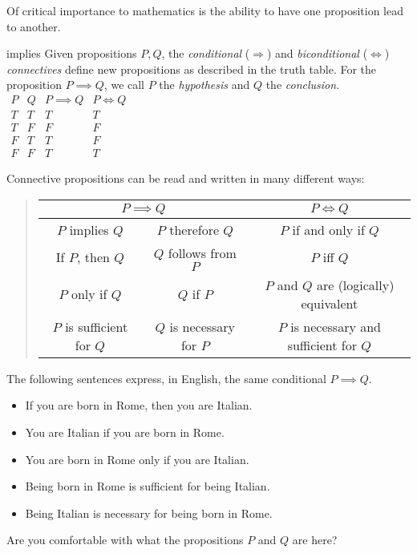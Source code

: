 Of critical importance to mathematics is the ability to have one proposition lead to another.

\begin{defn}[lower separated=false, sidebyside, sidebyside align=top seam, sidebyside gap=0pt, righthand width=0.37\linewidth]{}{implies}
	Given propositions $P,Q$, the \emph{conditional} ($\Longrightarrow$) and \emph{biconditional} ($\Longleftrightarrow$) \emph{connectives} define new propositions as described in the truth table.\smallbreak
	For the proposition $P\implies Q$, we call $P$ the \emph{hypothesis} and $Q$ the \emph{conclusion.}
	\tcblower
	\flushright$\begin{array}{cc||c|c}
	P & Q & P\implies Q & P\iff Q\\\hline
	T & T & T & T\\
	T & F & F & F\\
	F & T & T & F\\
	F & F & T & T
	\end{array}$
\end{defn}

Connective propositions can be read and written in many different ways:
\begin{quote}
	\def\arraystretch{1.05}
	\begin{tabular}{@{}cc|c}
		\multicolumn{2}{c|}{$P\implies Q$} & $P\iff Q$\\\hline
		$P$ implies $Q$ & $P$ therefore $Q$ & $P$ if and only if $Q$\\
		If $P$, then $Q$ & $Q$ follows from $P$ & $P$ iff $Q$\\
		$P$ only if $Q$ & $Q$ if $P$ & $P$ and $Q$ are (logically) equivalent\\
		$P$ is sufficient for $Q$ & $Q$ is necessary for $P$ & $P$ is necessary and sufficient for $Q$
	\end{tabular}
\end{quote}

\begin{example}{}{}
	The following sentences express, in English, the same conditional $P\implies Q$.\vspace{-1pt}
	\begin{itemize}\itemsep1pt
		\item If you are born in Rome, then you are Italian. 
		\item You are Italian if you are born in Rome. 
		\item You are born in Rome only if you are Italian. 
		\item Being born in Rome is sufficient for being Italian. 
		\item Being Italian is necessary for being born in Rome.\vspace{-1pt} 
	\end{itemize}
	Are you comfortable with what the propositions $P$ and $Q$ are here?
\end{example}

